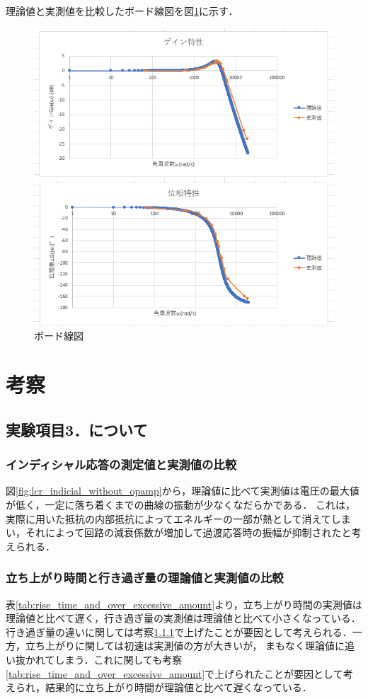 \documentclass{jlreq}
\numberwithin{equation}{section}
\begin{document}
理論値と実測値を比較したボード線図を図\ref{fig:bode_plot}に示す．
\begin{figure}[H]
  \centering
  \includegraphics[width=\textwidth]{assets/bode_plot.png}
  \caption{ボード線図}
  \label{fig:bode_plot}
\end{figure}

\section{考察}
\subsection{実験項目3．について}
\subsubsection{インディシャル応答の測定値と実測値の比較} \label{sec:discussion_indicial_comp}
図\ref{fig:lcr_indicial_without_opamp}から，理論値に比べて実測値は電圧の最大値が低く，一定に落ち着くまでの曲線の振動が少なくなだらかである．
これは，実際に用いた抵抗の内部抵抗によってエネルギーの一部が熱として消えてしまい，それによって回路の減衰係数が増加して過渡応答時の振幅が抑制されたと考えられる．

\subsubsection{立ち上がり時間と行き過ぎ量の理論値と実測値の比較}
表\ref{tab:rise_time_and_over_excessive_amount}より，立ち上がり時間の実測値は理論値と比べて遅く，行き過ぎ量の実測値は理論値と比べて小さくなっている．
行き過ぎ量の違いに関しては考察\ref{sec:discussion_indicial_comp}で上げたことが要因として考えられる．一方，立ち上がりに関しては初速は実測値の方が大きいが，
まもなく理論値に追い抜かれてしまう．これに関しても考察\ref{tab:rise_time_and_over_excessive_amount}で上げられたことが要因として考えられ，結果的に立ち上がり時間が理論値と比べて遅くなっている．
\end{document}
